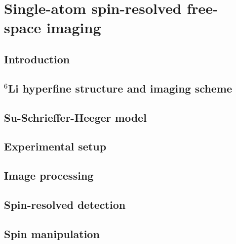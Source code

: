 \documentclass[twoside]{article}
\begin{document}
\newpage
\section{Single-atom spin-resolved free-space imaging} \label{sec:imaging}

\subsection{Introduction} \label{subsec:imaging-motivation} %


\subsection{\texorpdfstring{$^6$Li}{6Li} hyperfine structure and imaging scheme} \label{subsec:imaging-hyperfine}


\subsection{Su-Schrieffer-Heeger model} \label{subsec:imaging-ssh}

\subsection{Experimental setup} \label{subsec:imaging-setup}

\subsection{Image processing} \label{subsec:imaging-processing}

\subsection{Spin-resolved detection} \label{subsec:imaging-spin}

\subsection{Spin manipulation} \label{subsec:imaging-flip}

\end{document}
